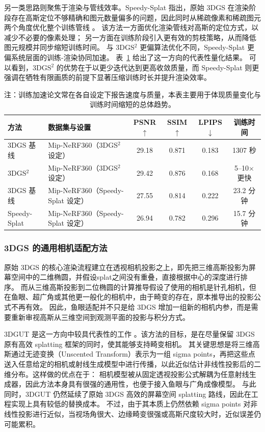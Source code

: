 另一类思路则聚焦于渲染与管线效率。Speedy-Splat 指出，原始 3DGS 在渲染阶段存在高斯定位不够精确和图元数量偏多的问题，因此同时从稀疏像素和稀疏图元两个角度优化整个训练管线 \cite{hanson2025speedy}。
该方法一方面优化渲染管线对高斯的定位方式，以减少不必要的像素处理；
另一方面在训练阶段引入更有效的剪枝策略，从而降低图元规模并同步缩短训练时间。
与 3DGS$^2$ 更偏算法优化不同，Speedy-Splat 更偏系统层面的训练-渲染协同加速。
表~\ref{tab:gs-train} 给出了这一方向的代表性量化结果。
可以看到，3DGS$^2$ 的优势在于以更少迭代达到更高收敛质量，而 Speedy-Splat 则更强调在牺牲有限画质的前提下显著压缩训练时长并提升渲染效率。

\begin{table}[htbp]
    \centering
    \caption{3DGS 训练加速方向的代表性结果}
    \label{tab:gs-train}
    \small
    \begin{tabular}{llcccc}
        \toprule
        方法 & 数据集与设置 & PSNR$\uparrow$ & SSIM$\uparrow$ & LPIPS$\downarrow$ & 训练时间 \\
        \midrule
        3DGS 基线 & Mip-NeRF360（3DGS$^2$ 设定） & 29.18 & 0.871 & 0.183 & 1307 秒 \\
        3DGS$^2$ & Mip-NeRF360（3DGS$^2$ 设定） & 29.42 & 0.876 & 0.168 & 5--10$\times$ 更快 \\
        3DGS 基线 & Mip-NeRF360（Speedy-Splat 设定） & 27.55 & 0.814 & 0.222 & 23.2 分钟 \\
        Speedy-Splat & Mip-NeRF360（Speedy-Splat 设定） & 26.94 & 0.782 & 0.296 & 15.7 分钟 \\
        \bottomrule
    \end{tabular}
    \caption*{\footnotesize 注：训练加速论文常在各自设定下报告速度与质量，本表主要用于体现质量变化与训练时间缩短的总体趋势。}
\end{table}

\subsubsection{3DGS 的通用相机适配方法}

原始 3DGS 的核心渲染流程建立在透视相机投影之上，即先把三维高斯投影为屏幕空间中的二维椭圆，并假设splat之间没有重叠，直接根据中心的深度进行排序。
而从三维高斯投影到二位椭圆的计算推导假设了使用的相机是针孔相机，但在鱼眼、超广角或其他更一般化的相机中，由于畸变的存在，原本推导出的投影公式不再有效。
因此，鱼眼适配并不只是给 3DGS 增加一组新的相机内参，而是需要重新审视高斯从三维空间到观测平面的投影与积分方式。

3DGUT 是这一方向中较具代表性的工作 \cite{wu20253dgut}。该方法的目标，是在尽量保留 3DGS 原有高效 splatting 框架的同时，使其能够支持畸变相机。
其关键思想是将三维高斯通过无迹变换（Unscented Transform）表示为一组 sigma points，再把这些点送入任意给定的相机或射线生成模型中进行传播，以此近似估计非线性投影后的二维分布。这样做的优点在于：
相机模型被从固定透视投影公式解耦为任意射线生成器，因此方法本身具有很强的通用性，也便于接入鱼眼与广角成像模型。
与此同时，3DGUT 仍然延续了原始 3DGS 高效的屏幕空间 splatting 路线，因此在工程实现上具有较低的替换成本。
不过，由于其本质上仍然依赖 sigma points 对非线性投影进行近似，当视场角很大、边缘畸变很强或高斯尺度较大时，近似误差仍可能累积。

